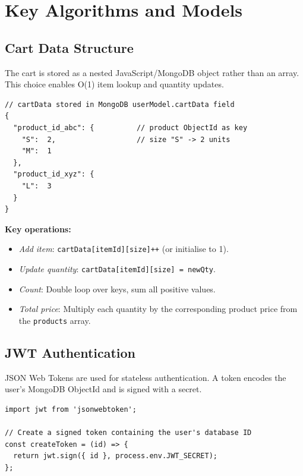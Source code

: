 \documentclass[12pt,a4paper]{report}
\begin{document}
\chapter{Key Algorithms and Models}

\section{Cart Data Structure}

The cart is stored as a nested JavaScript/MongoDB object rather than an array.
This choice enables O(1) item lookup and quantity updates.

\begin{lstlisting}[caption={Cart data structure example}, label=lst:cart]
// cartData stored in MongoDB userModel.cartData field
{
  "product_id_abc": {          // product ObjectId as key
    "S":  2,                   // size "S" -> 2 units
    "M":  1
  },
  "product_id_xyz": {
    "L":  3
  }
}
\end{lstlisting}

\textbf{Key operations:}
\begin{itemize}[leftmargin=*]
  \item \textit{Add item}: \texttt{cartData[itemId][size]++} (or initialise to 1).
  \item \textit{Update quantity}: \texttt{cartData[itemId][size] = newQty}.
  \item \textit{Count}: Double loop over keys, sum all positive values.
  \item \textit{Total price}: Multiply each quantity by the corresponding product price from the
        \texttt{products} array.
\end{itemize}

\section{JWT Authentication}

JSON Web Tokens are used for stateless authentication.
A token encodes the user's MongoDB ObjectId and is signed with a secret.

\begin{lstlisting}[caption={Token creation (userController.js)}, label=lst:jwt]
import jwt from 'jsonwebtoken';

// Create a signed token containing the user's database ID
const createToken = (id) => {
  return jwt.sign({ id }, process.env.JWT_SECRET);
};
\end{lstlisting}
\end{document}
